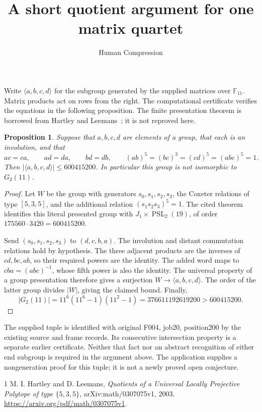 \documentclass[11pt]{article}
\title{A short quotient argument for one matrix quartet}
\author{Human Compression}
\date{}
\newtheorem{proposition}{Proposition}
\begin{document}
\maketitle
Write $\langle a,b,c,d\rangle$ for the subgroup generated by the supplied
matrices over $\mathbb F_{11}$. Matrix products act on rows from the right.
The computational certificate verifies the equations in the following
proposition. The finite presentation theorem is borrowed from
Hartley and Leemans~\cite[Theorem~3.2]{HL}; it is not reproved here.

\begin{proposition}
Suppose that $a,b,c,d$ are elements of a group, that each is an involution,
and that
\[
 ac=ca,\qquad ad=da,\qquad bd=db,\qquad
 (ab)^5=(bc)^3=(cd)^5=(abc)^5=1.
\]
Then $\lvert\langle a,b,c,d\rangle\rvert\leq600415200$.
In particular this group is not isomorphic to $G_2(11)$.
\end{proposition}
\begin{proof}
Let $W$ be the group with generators $s_0,s_1,s_2,s_3$, the Coxeter
relations of type $[5,3,5]$, and the additional relation
$(s_1s_2s_3)^5=1$. The cited theorem identifies this literal presented
group with $J_1\times\operatorname{PSL}_2(19)$, of order
$175560\cdot3420=600415200$.

Send $(s_0,s_1,s_2,s_3)$ to $(d,c,b,a)$. The involution and distant
commutation relations hold by hypothesis. The three adjacent products
are the inverses of $cd,bc,ab$, so their required powers are the identity.
The added word maps to $cba=(abc)^{-1}$, whose fifth power is also the
identity. The universal property of a group presentation therefore gives
a surjection $W\longrightarrow\langle a,b,c,d\rangle$.
The order of the latter group divides $|W|$, giving the claimed bound.
Finally,
\[
 |G_2(11)|=11^6(11^6-1)(11^2-1)=376611192619200>600415200.
\]
\end{proof}

The supplied tuple is identified with original F004, job20, position200
by the existing source and frame records. Its consecutive intersection
property is a separate earlier certificate. Neither that fact nor an
abstract recognition of either end subgroup is required in the argument
above. The application supplies a nongeneration proof for this tuple;
it is not a newly proved open conjecture.

\begin{thebibliography}{1}
 M. I. Hartley and D. Leemans,
\emph{Quotients of a Universal Locally Projective Polytope of type
$\{5,3,5\}$}, arXiv:math/0307075v1, 2003.
\url{https://arxiv.org/pdf/math/0307075v1}.
\end{thebibliography}
\end{document}
